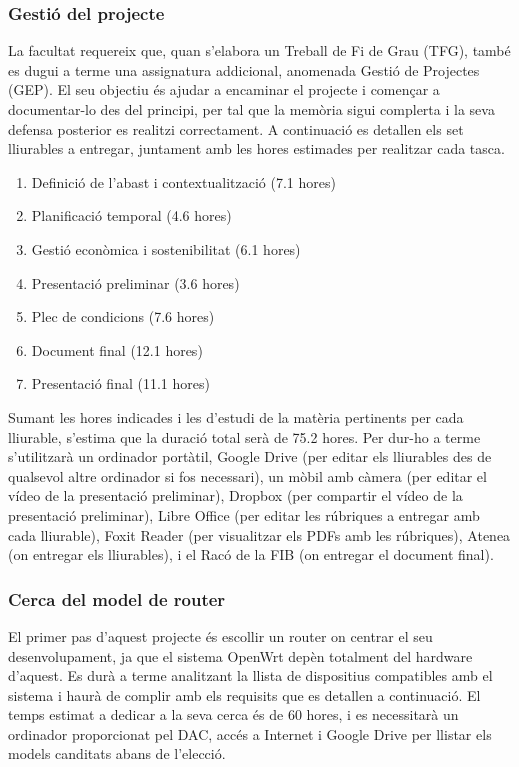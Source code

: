\documentclass[11pt]{article}
\begin{document}
\subsubsection{Gestió del projecte}
La facultat requereix que, quan s’elabora un Treball de Fi de Grau (TFG), també es dugui a terme una assignatura addicional,  anomenada Gestió de Projectes (GEP). El seu objectiu és ajudar a encaminar el projecte i començar a documentar-lo des del principi, per tal que la memòria sigui complerta i la seva defensa posterior es realitzi correctament. A continuació es detallen els set lliurables a entregar, juntament amb les hores estimades per realitzar cada tasca.
\begin{enumerate}
\item Definició de l’abast i contextualització (7.1 hores)
\item Planificació temporal (4.6 hores)
\item Gestió econòmica i sostenibilitat (6.1 hores)
\item Presentació preliminar (3.6 hores)
\item Plec de condicions (7.6 hores)
\item Document final (12.1 hores)
\item Presentació final (11.1 hores)
\end{enumerate}
Sumant les hores indicades i les d’estudi de la matèria pertinents per cada lliurable, s’estima que la duració total serà de 75.2 hores.
Per dur-ho a terme s’utilitzarà un ordinador portàtil, Google Drive (per editar els lliurables des de qualsevol altre ordinador si fos necessari), un mòbil amb càmera (per editar el vídeo de la presentació preliminar), Dropbox (per compartir el vídeo de la presentació preliminar), Libre Office (per editar les rúbriques a entregar amb cada lliurable), Foxit Reader (per visualitzar els PDFs amb les rúbriques), Atenea (on entregar els lliurables), i el Racó de la FIB (on entregar el document final).
\subsubsection{Cerca del model de router}
El primer pas d’aquest projecte és escollir un router on centrar el seu desenvolupament, ja que el sistema OpenWrt depèn totalment del hardware d’aquest. Es durà a terme analitzant la llista de dispositius compatibles amb el sistema i haurà de complir amb els requisits que es detallen a continuació. El temps estimat a dedicar a la seva cerca és de 60 hores, i es necessitarà un ordinador proporcionat pel DAC, accés a Internet i Google Drive per llistar els models canditats abans de l’elecció.
\end{document}
